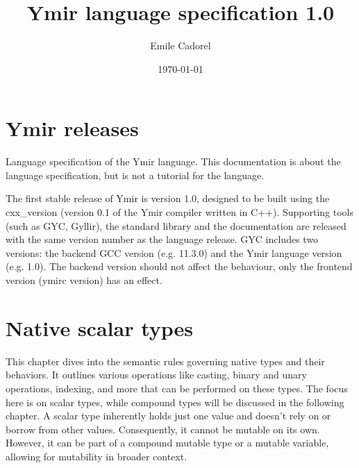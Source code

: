 \documentclass[a4paper,11pt]{book}
\author{Emile Cadorel}
\date{\today}
\title{Ymir language specification 1.0}
\begin{document}
\setlength{\aweboxleftmargin}{0.05\linewidth}
\setlength{\aweboxcontentwidth}{0.93\linewidth}


\maketitle
\dominitoc
\dominilof
\dominilot

\chapter*{Ymir releases}

Language specification of the Ymir language. This documentation is about the language specification, but is not a tutorial for the language.


The first stable release of Ymir is version 1.0, designed to be built using the
cxx\_version (version 0.1 of the Ymir compiler written in C++). Supporting tools
(such as GYC, Gyllir), the standard library and the documentation are released
with the same version number as the language release. GYC includes two versions:
the backend GCC version (e.g. 11.3.0) and the Ymir language version (e.g. 1.0).
The backend version should not affect the behaviour, only the frontend version
(ymirc version) has an effect.

\begin{multicols*}{2}
  \tableofcontents
\end{multicols*}


\chapter{Native scalar types}

This chapter dives into the semantic rules governing native types and their
behaviors. It outlines various operations like casting, binary and unary
operations, indexing, and more that can be performed on these types. The focus
here is on scalar types, while compound types will be discussed in the following
chapter. A scalar type inherently holds just one value and doesn't rely on or
borrow from other values. Consequently, it cannot be mutable on its own.
However, it can be part of a compound mutable type or a mutable variable,
allowing for mutability in broader context.

\begin{multicols*}{2}
  \minitoc%
  
\end{multicols*}
\end{document}
